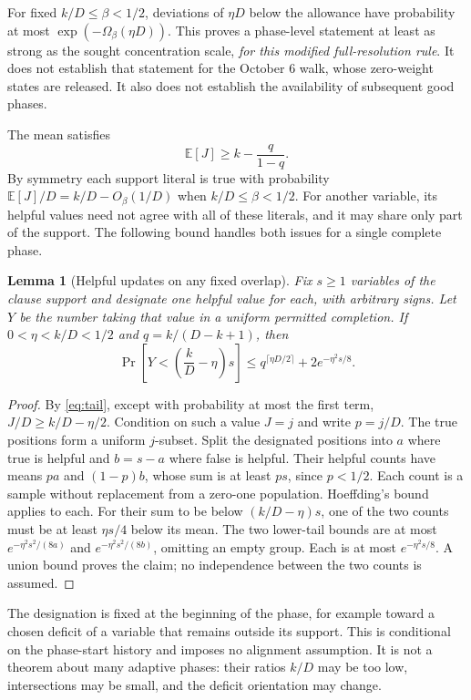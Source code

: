 \documentclass[11pt,a4paper]{article}
\newtheorem{lemma}[proposition]{Lemma}
\theoremstyle{remark}
\newcommand{\E}{\mathbb E}
\begin{document}
For fixed $k/D\le\beta<1/2$, deviations of $\eta D$ below the allowance
have probability at most $\exp(-\Omega_\beta(\eta D))$. This proves a
phase-level statement at least as strong as the sought concentration scale,
\emph{for this modified full-resolution rule}. It does not establish that
statement for the October 6 walk, whose zero-weight states are released.
It also does not establish the availability of subsequent good phases.

The mean satisfies
\[
 \E[J]\ge k-\frac{q}{1-q}.
\]
By symmetry each support literal is true with probability
$\E[J]/D=k/D-O_\beta(1/D)$ when $k/D\le\beta<1/2$.
For another variable, its helpful values need not agree with all of these
literals, and it may share only part of the support. The following bound
handles both issues for a single complete phase.

\begin{lemma}[Helpful updates on any fixed overlap]
Fix $s\ge1$ variables of the clause support and designate one helpful value
for each, with arbitrary signs. Let $Y$ be the number taking that value in
a uniform permitted completion. If $0<\eta<k/D<1/2$ and
$q=k/(D-k+1)$, then
\begin{equation}
 \Pr\!\left[Y<\left(\frac{k}{D}-\eta\right)s\right]
 \le q^{\lceil\eta D/2\rceil}+2e^{-\eta^2s/8}.       \label{eq:overlap}
\end{equation}
\end{lemma}
\begin{proof}
By \eqref{eq:tail}, except with probability at most the first term,
$J/D\ge k/D-\eta/2$. Condition on such a value $J=j$ and write $p=j/D$.
The true positions form a uniform $j$-subset. Split the designated positions
into $a$ where true is helpful and $b=s-a$ where false is helpful.
Their helpful counts have means $pa$ and $(1-p)b$, whose sum is at least
$ps$, since $p<1/2$. Each count is a sample without replacement from a
zero-one population. Hoeffding's bound \cite{Hoe63} applies to each.
For their sum to be below $(k/D-\eta)s$, one of the two counts must be at
least $\eta s/4$ below its mean. The two lower-tail bounds are at most
$e^{-\eta^2s^2/(8a)}$ and $e^{-\eta^2s^2/(8b)}$, omitting an empty group.
Each is at most $e^{-\eta^2s/8}$. A union bound proves the claim; no
independence between the two counts is assumed.
\end{proof}

The designation is fixed at the beginning of the phase, for example toward
a chosen deficit of a variable that remains outside its support. This is
conditional on the phase-start history and imposes no alignment assumption.
It is not a theorem about many adaptive phases: their ratios $k/D$ may be
too low, intersections may be small, and the deficit orientation may change.
\end{document}
